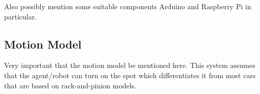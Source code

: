 Also possibly mention some suitable components Arduino and Raspberry Pi in particular. 

\subsection{Motion Model}
Very important that the motion model be mentioned here. This system assumes that the agent/robot can turn on the spot which differentiates it from most cars that are based on rack-and-pinion models.

\newpage


